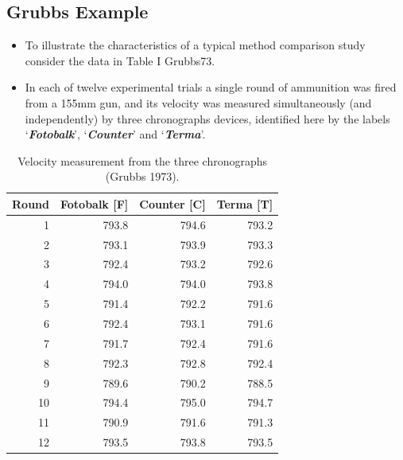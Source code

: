 \documentclass[compress]{beamer}        %
\begin{document}
\subsection{Grubbs Example}
\begin{frame}
\large
\vspace{-1cm}
\begin{itemize}
\item To illustrate the characteristics of a typical method comparison
study consider the data in Table I  \alert{Grubbs73}. 
\item 


In each of
twelve experimental trials a single round of ammunition was fired
from a 155mm gun, and its velocity was measured simultaneously
(and independently) by three chronographs devices, identified here
by the labels `\textbf{\textit{Fotobalk}}', `\textbf{\textit{Counter}}' and `\textbf{\textit{Terma}}'.
\end{itemize}
\end{frame}
\begin{frame}
\large

\begin{table}[ht]
\begin{center}
\begin{tabular}{rrrr}
  \hline
  Round& Fotobalk [F] & Counter [C]& Terma [T]\\
  \hline
  1 & 793.8 & 794.6 & 793.2 \\
  2 & 793.1 & 793.9 & 793.3 \\
  3 & 792.4 & 793.2 & 792.6 \\
  4 & 794.0 & 794.0 & 793.8 \\
  5 & 791.4 & 792.2 & 791.6 \\
  6 & 792.4 & 793.1 & 791.6 \\
  7 & 791.7 & 792.4 & 791.6 \\
  8 & 792.3 & 792.8 & 792.4 \\
  9 & 789.6 & 790.2 & 788.5 \\
  10 & 794.4 & 795.0 & 794.7 \\
  11 & 790.9 & 791.6 & 791.3 \\
  12 & 793.5 & 793.8 & 793.5 \\
   \hline
\end{tabular}
\caption{Velocity measurement from the three chronographs (Grubbs
1973).}
\end{center}
\end{table}
\end{frame}
\end{document}
